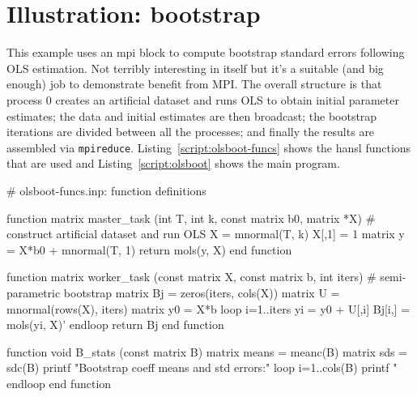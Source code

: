 \documentclass{article}
\begin{document}
\clearpage


\section{Illustration: bootstrap}
\label{sec:olsboot}

This example uses an mpi block to compute bootstrap standard errors
following OLS estimation. Not terribly interesting in itself but it's
a suitable (and big enough) job to demonstrate benefit from MPI.  The
overall structure is that process 0 creates an artificial dataset and
runs OLS to obtain initial parameter estimates; the data and initial
estimates are then broadcast; the bootstrap iterations are divided
between all the processes; and finally the results are assembled via
\texttt{mpireduce}.  Listing~\ref{script:olsboot-funcs} shows the hansl
functions that are used and Listing~\ref{script:olsboot} shows the main
program.

\begin{script}[htbp]
  \caption{hansl functions for OLS bootstrap example}
  \label{script:olsboot-funcs}
\begin{scode}
# olsboot-funcs.inp: function definitions

function matrix master_task (int T, int k, const matrix b0,
                             matrix *X)
  # construct artificial dataset and run OLS
  X = mnormal(T, k)
  X[,1] = 1
  matrix y = X*b0 + mnormal(T, 1)
  return mols(y, X)
end function

function matrix worker_task (const matrix X, const matrix b,
                             int iters)
  # semi-parametric bootstrap
  matrix Bj = zeros(iters, cols(X))
  matrix U = mnormal(rows(X), iters)
  matrix y0 = X*b
  loop i=1..iters
    yi = y0 + U[,i]
    Bj[i,] = mols(yi, X)'
  endloop
  return Bj
end function

function void B_stats (const matrix B)
  matrix means = meanc(B)
  matrix sds = sdc(B)
  printf "Bootstrap coeff means and std errors:\n\n"
  loop i=1..cols(B)
    printf "%
  endloop
end function
\end{scode}
\end{script}
\end{document}
